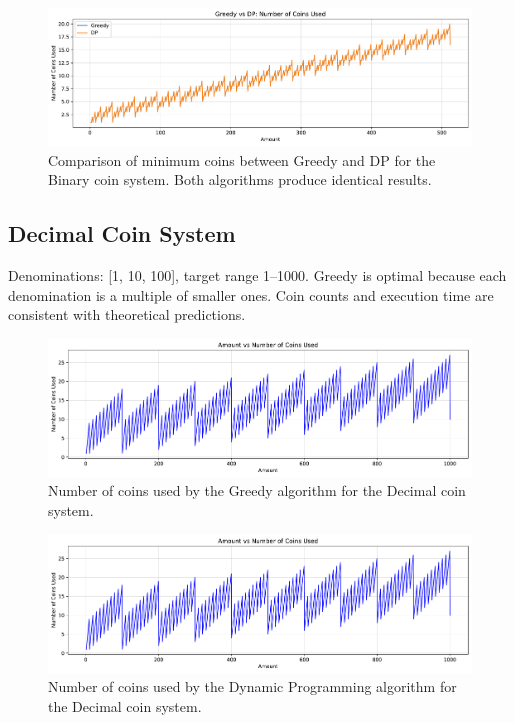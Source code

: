 \documentclass[12pt,a4paper]{report}
\begin{document}
\begin{figure}[H]
  \centering
  \includegraphics[width=\textwidth]{graphs/compare_coins_binary_plot.pdf}
  \caption{Comparison of minimum coins between Greedy and DP for the Binary coin system. Both algorithms produce identical results.}
  \label{fig:compare_coins_binary}
\end{figure}

\subsection{Decimal Coin System}
Denominations: [1, 10, 100], target range 1--1000. Greedy is optimal because each denomination is a multiple of smaller ones. Coin counts and execution time are consistent with theoretical predictions.

\begin{figure}[H]
  \centering
  \includegraphics[width=\textwidth]{graphs/greedy_coins_decimal_plot.pdf}
  \caption{Number of coins used by the Greedy algorithm for the Decimal coin system.}
  \label{fig:greedy_coins_decimal}
\end{figure}

\begin{figure}[H]
  \centering
  \includegraphics[width=\textwidth]{graphs/dp_coins_decimal_plot.pdf}
  \caption{Number of coins used by the Dynamic Programming algorithm for the Decimal coin system.}
  \label{fig:dp_coins_decimal}
\end{figure}
\end{document}
